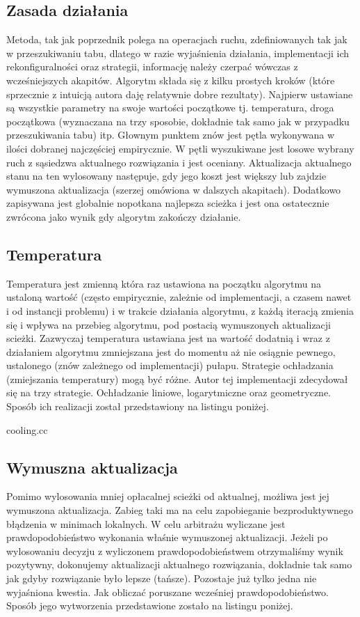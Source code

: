 \documentclass[polish,polish,a4paper]{article}
\begin{document}
\subsection{Zasada działania}
Metoda, tak jak poprzednik polega na operacjach ruchu, zdefiniowanych tak jak w przeszukiwaniu tabu, dlatego w razie wyjaśnienia
działania, implementacji ich rekonfiguralności oraz strategii, informację należy czerpać wówczas z wcześniejszych akapitów.
Algorytm składa się z kilku prostych kroków (które sprzecznie z intuicją autora daję relatywnie dobre rezultaty). Najpierw ustawiane
są wszystkie parametry na swoje wartości początkowe tj. temperatura, droga początkowa (wyznaczana na trzy sposobie, dokładnie tak samo
jak w przypadku przeszukiwania tabu) itp. Głownym punktem znów jest pętla wykonywana w ilości dobranej najczęściej empirycznie.
W pętli wyszukiwane jest losowe wybrany ruch z sąsiedzwa aktualnego rozwiązania i jest oceniany. Aktualizacja aktualnego stanu na ten wylosowany
następuje, gdy jego koszt jest większy lub zajdzie wymuszona aktualizacja (szerzej omówiona w dalszych akapitach). Dodatkowo zapisywana jest
globalnie nopotkana najlepsza scieżka i jest ona ostatecznie zwrócona jako wynik gdy algorytm zakończy działanie.

\subsection{Temperatura}
Temperatura jest zmienną która raz ustawiona na początku algorytmu na ustaloną wartość (często empirycznie, zależnie od implementacji,
a czasem nawet i od instancji problemu) i w trakcie działania algorytmu, z każdą iteracją zmienia się i wpływa na przebieg algorytmu,
pod postacią wymuszonych aktualizacji scieżki.
Zazwyczaj temperatura ustawiana jest na wartość dodatnią i wraz z działaniem algorytmu zmniejszana jest do momentu aż nie osiągnie
pewnego, ustalonego (znów zależnego od implementacji) pułapu. Strategie ochładzania (zmiejszania temperatury) mogą być różne. Autor tej
implementacji zdecydował się na trzy strategie. Ochładzanie liniowe, logarytmiczne oraz geometryczne. Sposób ich realizacji został przedstawiony
na listingu poniżej.


{cooling.cc}

\subsection{Wymuszna aktualizacja}
Pomimo wylosowania mniej opłacalnej scieżki od aktualnej, możliwa jest jej wymuszona aktualizacja. Zabieg taki ma na celu zapobieganie
bezproduktywnego błądzenia w minimach lokalnych. W celu arbitrażu wyliczane jest prawdopodobieństwo wykonania właśnie wymuszonej aktualizacji.
Jeżeli po wylosowaniu decyzju z wyliczonem prawdopodobieństwem otrzymaliśmy wynik pozytywny, dokonujemy aktualizacji aktualnego rozwiązania,
dokładnie tak samo jak gdyby rozwiązanie było lepsze (tańsze). Pozostaje już tylko jedna nie wyjaśniona kwestia. Jak obliczać poruszane wcześniej
prawdopodobieństwo. Sposób jego wytworzenia przedstawione zostało na listingu poniżej.
\end{document}

